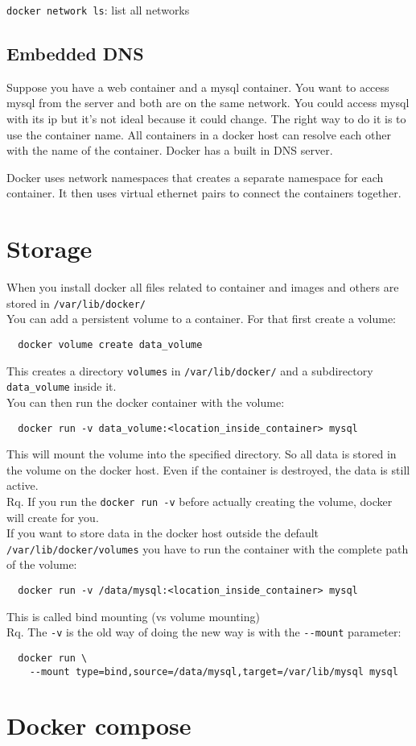 \documentclass[french]{article}
\begin{document}
\verb|docker network ls|: list all networks

\subsection{Embedded DNS}

Suppose you have a web container and a mysql container. You want to access mysql from the server and both are on the same network. You could access mysql with its ip but it's not ideal because it could change. The right way to do it is to use the container name. All containers in a docker host can resolve each other with the name of the container. Docker has a built in DNS server.

Docker uses network namespaces that creates a separate namespace for each container. It then uses virtual ethernet pairs to connect the containers together.

\section{Storage}

When you install docker all files related to container and images and others are stored in \verb|/var/lib/docker/|\\

You can add a persistent volume to a container. For that first create a volume:
\begin{verbatim}
  docker volume create data_volume
\end{verbatim}
This creates a directory \verb|volumes| in \verb|/var/lib/docker/| and a subdirectory \verb|data_volume| inside it.\\

You can then run the docker container with the volume:
\begin{verbatim}
  docker run -v data_volume:<location_inside_container> mysql
\end{verbatim}
This will mount the volume into the specified directory. So all data is stored in the volume on the docker host. Even if the container is destroyed, the data is still active.\\

Rq. If you run the \verb|docker run -v| before actually creating the volume, docker will create for you.\\

If you want to store data in the docker host outside the default \verb|/var/lib/docker/volumes| you have to run the container with the complete path of the volume:
\begin{verbatim}
  docker run -v /data/mysql:<location_inside_container> mysql
\end{verbatim}
This is called bind mounting (vs volume mounting)\\

Rq. The \verb|-v| is the old way of doing the new way is with the \verb|--mount| parameter:
\begin{verbatim}
  docker run \
    --mount type=bind,source=/data/mysql,target=/var/lib/mysql mysql
\end{verbatim}

\section{Docker compose}
\end{document}
